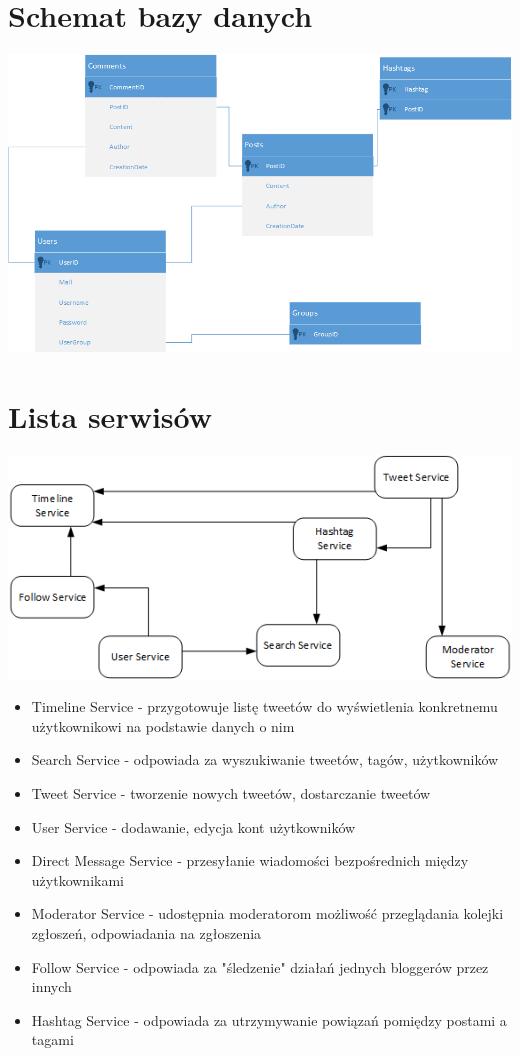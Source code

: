 \documentclass[a4paper]{article}
\begin{document}
\section{Schemat bazy danych}
\includegraphics[width=\textwidth]{database}

\section{Lista serwisów}
\includegraphics[width=\textwidth]{services}
\begin{itemize}
\item{Timeline Service - przygotowuje listę tweetów do wyświetlenia konkretnemu użytkownikowi na podstawie danych o nim}
\item{Search Service - odpowiada za wyszukiwanie tweetów, tagów, użytkowników}
\item{Tweet Service - tworzenie nowych tweetów, dostarczanie tweetów}
\item{User Service - dodawanie, edycja kont użytkowników}
\item{Direct Message Service - przesyłanie wiadomości bezpośrednich między użytkownikami}
\item{Moderator Service - udostępnia moderatorom możliwość przeglądania kolejki zgłoszeń, odpowiadania na zgłoszenia}
\item{Follow Service - odpowiada za "śledzenie" działań jednych bloggerów przez innych}
\item{Hashtag Service - odpowiada za utrzymywanie powiązań pomiędzy postami a tagami}

\end{itemize}
\end{document}
